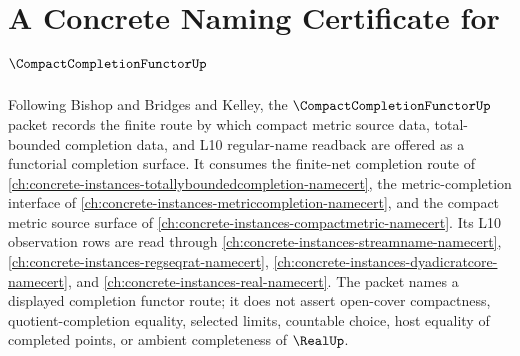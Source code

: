 \chapter{A Concrete Naming Certificate for $\CompactCompletionFunctorUp$}
\label{ch:concrete-instances-compact-completion-functor-namecert}

Following Bishop and Bridges and Kelley, the $\CompactCompletionFunctorUp$ packet records the finite route by which compact metric source data, total-bounded completion data, and L10 regular-name readback are offered as a functorial completion surface. It consumes the finite-net completion route of \autoref{ch:concrete-instances-totallyboundedcompletion-namecert}, the metric-completion interface of \autoref{ch:concrete-instances-metriccompletion-namecert}, and the compact metric source surface of \autoref{ch:concrete-instances-compactmetric-namecert}. Its L10 observation rows are read through \autoref{ch:concrete-instances-streamname-namecert}, \autoref{ch:concrete-instances-regseqrat-namecert}, \autoref{ch:concrete-instances-dyadicratcore-namecert}, and \autoref{ch:concrete-instances-real-namecert}. The packet names a displayed completion functor route; it does not assert open-cover compactness, quotient-completion equality, selected limits, countable choice, host equality of completed points, or ambient completeness of $\RealUp$.

